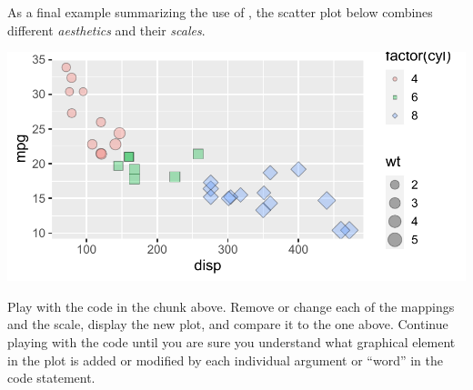 \documentclass[krantz2]{krantz}\usepackage{knitr}
\begin{document}

As a final example summarizing the use of , the scatter plot below combines different \emph{aesthetics} and their \emph{scales}.

\begin{knitrout}\footnotesize
{}\color{fgcolor}\begin{kframe}
\begin{alltt}
\hlstd{(} 
        \hlstd{=} \hlstd{(}     \hlstd{=} 
                      \hlstd{=}    \hlopt{+}
  \hlstd{(} \hlstd{=} \hlstd{,}  \hlstd{=} \hlstd{)} \hlopt{+}
  \hlstd{()} \hlopt{+}
  \hlstd{(} \hlstd{=} \hlstd{(}\hlstd{,}
                                \hlstd{,}
                                \hlstd{))}
\end{alltt}
\end{kframe}

{\centering \includegraphics[width=.7\textwidth]{figure/pos-scatter-18-1} 

}


\end{knitrout}

\begin{playground}
Play with the code in the chunk above. Remove or change each of the mappings and the scale, display the new plot, and compare it to the one above. Continue playing with the code until you are sure you understand what graphical element in the plot is added or modified by each individual argument or ``word'' in the code statement.
\end{playground}
\end{document}
